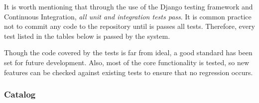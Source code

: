 It is worth mentioning that through the use of the Django testing framework and
Continuous Integration, \emph{all unit and integration tests pass}. It is
common practice not to commit any code to the repository until is passes all
tests. Therefore, every test listed in the tables below is passed by the
system.

Though the code covered by the tests is far from ideal, a good standard has
been set for future development. Also, most of the core functionality is
tested, so new features can be checked against existing tests to ensure that no
regression occurs.

\vfill

\subsubsection{Catalog}

